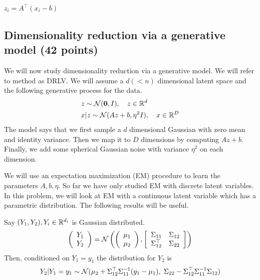 \begin{enumerate}
\begin{soln}
  $z_i = A^\top (x_i - b)$
\end{soln}


\end{enumerate}


\subsection{Dimensionality reduction via a generative model (42 points)}

We will now study dimensionality reduction via a generative model.
We will refer to method as DRLV.
We will assume a $d (<n)$ dimensional latent space and
the following generative process for the data.
\begin{align*}
& z \sim \mathcal{N}({\bf 0}, I),  \quad  z\in \mathbb{R}^d \\
& x|z \sim \mathcal{N}(Az + b, \eta^2 I),  \quad  x\in \mathbb{R}^D 
\end{align*}
The model says that we first sample a $d$ dimensional Gaussian with zero mean
and identity variance. Then we map it to $D$ dimensions by computing $Az+b$.
Finally, we add some spherical Gaussian noise with variance $\eta^2$ on each
dimension.

We will use an expectation maximization (EM)
procedure to learn the parameters $A, b, \eta$. So far we have only studied
 EM with discrete latent variables. In this problem, we will look at
EM with a continuous latent variable which has a parametric distribution.
The following results will be useful.\\

\begin{fact}
Say $(Y_1, Y_2), Y_i \in \mathbb{R}^{d_i}$ is Gaussian distributed.
\[
\left(\begin{array}{c}Y_1 \\ Y_2\end{array}\right) =
\mathcal{N} \left( \left(\begin{array}{c} \mu_1 \\ \mu_2 \end{array} \right), 
\left[ \begin{array}{cc} \Sigma_{11} & \Sigma_{12} \\ \Sigma_{12}^\top &
  \Sigma_{22} \end{array} \right] 
  \right)
\]
Then, conditioned on $Y_1 = y_1$ the distribution for $Y_2$ is
\[
Y_2 | Y_1 = y_1 \sim \mathcal{N}(\mu_2+ \Sigma_{12}^\top \Sigma_{11}^{-1} (y_1 - \mu_1), \;
  \Sigma_{22} - \Sigma_{12}^\top \Sigma_{11}^{-1}\Sigma_{12} )
\]
\end{fact}

